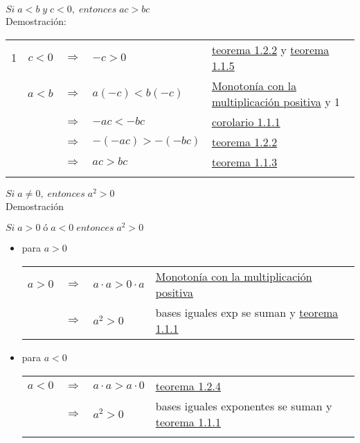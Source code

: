 \begin{teo}
$Si \; a<b \; y \; c<0, \; entonces \; ac>bc$\\ \label{teo 1.2.4}
Demostración:
\begin{center}
\begin{tabular}{c r c l l}
1&$c<0$&$\Rightarrow$&$-c>0$&\hyperref[teo 1.2.2]{teorema 1.2.2} y \hyperref[teo 1.1.5]{teorema 1.1.5}\\
&$a<b$&$\Rightarrow$&$a(-c)<b(-c)$&\hyperref[O4]{Monotonía con la multiplicación positiva} y 1\\
&&$\Rightarrow$&$-ac<-bc$&\hyperref[cor 1.1.1]{corolario 1.1.1}\\
&&$\Rightarrow$&$-(-ac)>-(-bc)$&\hyperref[teo 1.2.2]{teorema 1.2.2}\\
&&$\Rightarrow$&$ac>bc$&\hyperref[teo 1.1.3]{teorema 1.1.3}\\\\
\end{tabular}
\end{center}
\end{teo}

\begin{teo}
$Si \; a \neq 0, \; entonces \; a^2>0$ \label{teo 1.2.5}\\
Demostración
\begin{center}
$Si \; a>0 \; ó \; a<0 \; entonces \; a^2>0 $
\end{center}
\begin{itemize}
\item para $a>0$
\begin{center}
\begin{tabular}{r c l l}
$a>0$&$\Rightarrow$&$a\cdot a>0\cdot a $&\hyperref[O4]{Monotonía con la multiplicación positiva}\\
&$\Rightarrow$&$a^2>0$&bases iguales exp se suman y \hyperref[teo 1.1.1]{teorema 1.1.1} \\
\end{tabular}
\end{center}
\item para $a<0$
\begin{center}
\begin{tabular}{r c l l}
$a<0$&$\Rightarrow$&$a\cdot a > a \cdot 0$&\hyperref[teo 1.2.4]{teorema 1.2.4}\\
&$\Rightarrow$&$a^2>0$&bases iguales exponentes se suman y \hyperref[teo 1.1.1]{teorema 1.1.1} \\\\
\end{tabular}
\end{center}
\end{itemize}
\end{teo}


